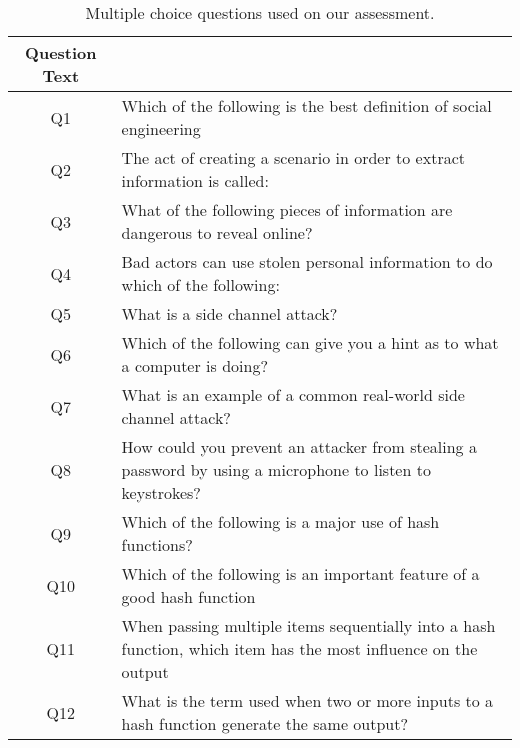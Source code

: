 



\begin{table}[h]
  \scriptsize
  \begin{tabular}{c | p{6cm}}
Question Text  &     \\
\hline
Q1 & Which of the following is the best definition of social engineering \\
Q2  & The act of creating a scenario in order to extract information is called:   \\
Q3 & What of the following pieces of information are dangerous to reveal online?  \\
Q4  & Bad actors can use stolen personal information to do which of the following: \\
Q5 & What is a side channel attack?  \\
Q6  & Which of the following can give you a hint as to what a computer is doing?   \\
Q7 & What is an example of a common real-world side channel attack? \\
Q8  & How could you prevent an attacker from stealing a password by using a microphone to listen to keystrokes?\\
Q9 & Which of the following is a major use of hash functions? \\
Q10 & Which of the following is an important feature of a good hash function  \\
Q11 & When passing multiple items sequentially into a hash function, which item has the most influence on the output \\
Q12 & What is the term used when two or more inputs to a hash function generate the same output? \\
\end{tabular}
\caption{Multiple choice questions used on our assessment.}
\label{fig:assessment}
\end{table}



